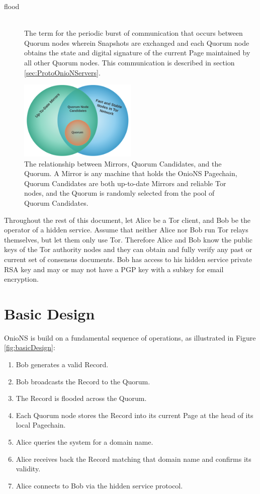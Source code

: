 \begin{description}
	\item[flood] \hfill \\
		The term for the periodic burst of communication that occurs between Quorum nodes wherein Snapshots are exchanged and each Quorum node obtains the state and digital signature of the current Page maintained by all other Quorum nodes. This communication is described in section \ref{sec:ProtoOnioNServers}.
\end{description}

\begin{figure}[htbp]
	\centering
	\includegraphics[width=0.5\textwidth]{images/LucidCharts/Participants.pdf}
	\caption{The relationship between Mirrors, Quorum Candidates, and the Quorum. A Mirror is any machine that holds the OnioNS Pagechain, Quorum Candidates are both up-to-date Mirrors and reliable Tor nodes, and the Quorum is randomly selected from the pool of Quorum Candidates.}
\end{figure}

Throughout the rest of this document, let Alice be a Tor client, and Bob be the operator of a hidden service. Assume that neither Alice nor Bob run Tor relays themselves, but let them only use Tor. Therefore Alice and Bob know the public keys of the Tor authority nodes and they can obtain and fully verify any past or current set of consensus documents. Bob has access to his hidden service private RSA key and may or may not have a PGP key with a subkey for email encryption.

\section{Basic Design}
\label{sec:BasicDesign}

OnioNS is build on a fundamental sequence of operations, as illustrated in Figure \ref{fig:basicDesign}:

\begin{enumerate}
	\item Bob generates a valid Record.
	\item Bob broadcasts the Record to the Quorum.
	\item The Record is flooded across the Quorum.
	\item Each Quorum node stores the Record into its current Page at the head of its local Pagechain.
	\item Alice queries the system for a domain name.
	\item Alice receives back the Record matching that domain name and confirms its validity.
	\item Alice connects to Bob via the hidden service protocol.
\end{enumerate}

